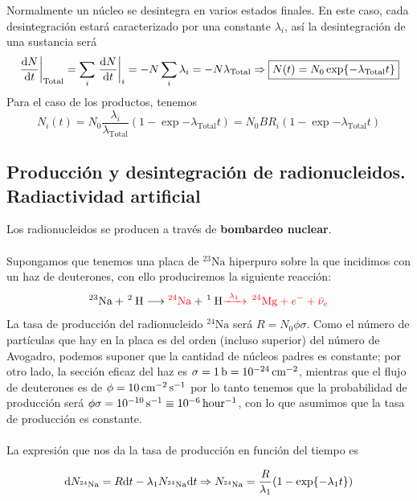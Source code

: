 Normalmente un núcleo se desintegra en varios estados finales. En este caso, cada desintegración estará caracterizado por una constante $\lambda_i$, así la desintegración de una sustancia será 
\begin{equation}
    \eval{\dv{N}{t}}_\mathrm{Total}=\sum_i \eval{\dv{N}{t}}_i=-N\sum_i\lambda_i=-N \lambda_\mathrm{Total} \Rightarrow \boxed{N(t)=N_0\exp{-\lambda_\mathrm{Total}t}}
\end{equation}
Para el caso de los productos, tenemos
\begin{equation}
    N_{i}(t)=N_0 \frac{\lambda_i}{\lambda_\mathrm{Total}}(1-\exp{-\lambda_\mathrm{Total}t})=N_0BR_i (1-\exp{-\lambda_\mathrm{Total}t})
\end{equation}
\newpage
\subsection{Producción y desintegración de radionucleidos. Radiactividad artificial}
Los radionucleidos se producen a través de \textbf{bombardeo nuclear}.\\\\
Supongamos que tenemos una placa de $^{23}\mathrm{Na}$ hiperpuro sobre la que incidimos con un haz de deuterones, con ello produciremos la siguiente reacción:
\begin{equation*}
    ^{23}\mathrm{Na} + ^{\ 2}\mathrm{H}\longrightarrow \textcolor{red}{^{24}\mathrm{Na}} + ^{\ 1}\mathrm{H} \textcolor{red}{\xrightarrow[]{\ \lambda_1 \ } \,^{24}\mathrm{Mg}+e^-+\Bar{\nu}_e }
\end{equation*}
La tasa de producción del radionucleido $^{24}\mathrm{Na}$ será $R=N_{0}\phi\sigma$. Como el número de partículas que hay en la placa es del orden (incluso superior) del número de Avogadro,  podemos suponer que la cantidad de  núcleos padres es constante; por otro lado, la sección eficaz del haz es $\sigma=\unit[1]{b}=\unit[10^{-24}]{cm^{-2}}$, mientras que el flujo de deuterones es de $\phi=\unit[10]{cm^{-2}\,s^{-1}}$ por lo tanto tenemos que la probabilidad de producción será $\phi \sigma =\unit[10^{-10}]{s^{-1}}\equiv \unit[10^{-6}]{hour^{-1}}$, con lo que asumimos que la tasa de producción es constante.\\\\
La expresión que nos da la tasa de producción en función del tiempo es

\begin{equation}
    \dd N_{^{24}\mathrm{Na}}=R\dd t-\lambda_1N_{^{24}\mathrm{Na}}\dd t \Rightarrow N_{^{24}\mathrm{Na}}=\frac{R}{\lambda_1}\qty(1-\exp{-\lambda_1 t})
    \label{eq: tasa de produccion}
\end{equation}

